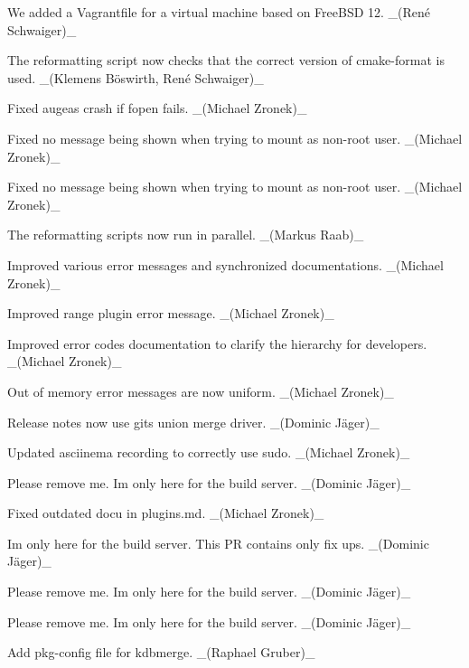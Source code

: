 \begin{DoxyItemize}
\item We added a Vagrantfile for a virtual machine based on Free\+B\+SD 12. \+\_\+(René Schwaiger)\+\_\+
\end{DoxyItemize}


\begin{DoxyItemize}
\item The reformatting script now checks that the correct version of {\ttfamily cmake-\/format} is used. \+\_\+(Klemens Böswirth, René Schwaiger)\+\_\+
\item Fixed augeas crash if fopen fails. \+\_\+(\+Michael Zronek)\+\_\+
\item Fixed no message being shown when trying to mount as non-\/root user. \+\_\+(\+Michael Zronek)\+\_\+
\item Fixed no message being shown when trying to mount as non-\/root user. \+\_\+(\+Michael Zronek)\+\_\+
\item The reformatting scripts now run in parallel. \+\_\+(\+Markus Raab)\+\_\+
\item Improved various error messages and synchronized documentations. \+\_\+(\+Michael Zronek)\+\_\+
\item Improved {\ttfamily range} plugin error message. \+\_\+(\+Michael Zronek)\+\_\+
\item Improved error codes documentation to clarify the hierarchy for developers. \+\_\+(\+Michael Zronek)\+\_\+
\item Out of memory error messages are now uniform. \+\_\+(\+Michael Zronek)\+\_\+
\item Release notes now use git\textquotesingle{}s union merge driver. \+\_\+(Dominic Jäger)\+\_\+
\item Updated asciinema recording to correctly use {\ttfamily sudo}. \+\_\+(\+Michael Zronek)\+\_\+
\item Please remove me. I\textquotesingle{}m only here for the build server. \+\_\+(Dominic Jäger)\+\_\+
\item Fixed outdated docu in plugins.\+md. \+\_\+(\+Michael Zronek)\+\_\+
\item I\textquotesingle{}m only here for the build server. This PR contains only fix ups. \+\_\+(Dominic Jäger)\+\_\+
\item Please remove me. I\textquotesingle{}m only here for the build server. \+\_\+(Dominic Jäger)\+\_\+
\item Please remove me. I\textquotesingle{}m only here for the build server. \+\_\+(Dominic Jäger)\+\_\+
\item Add pkg-\/config file for kdbmerge. \+\_\+(\+Raphael Gruber)\+\_\+
\end{DoxyItemize}


